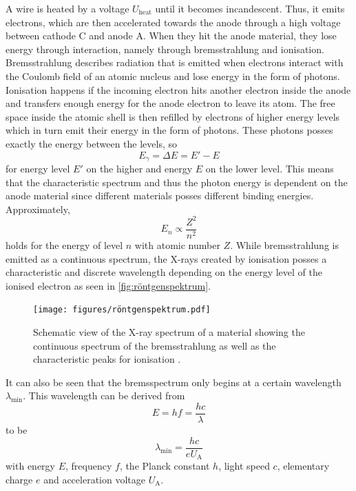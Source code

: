 A wire is heated by a voltage $U_\text{heat}$ until it becomes incandescent.
Thus, it emits electrons, which are then accelerated towards the anode through a high voltage between cathode C and anode A.
When they hit the anode material, they lose energy through interaction, namely through bremsstrahlung and ionisation.
Bremsstrahlung describes radiation that is emitted when electrons interact with the Coulomb field of an atomic nucleus and lose energy in the form of photons.
Ionisation happens if the incoming electron hits another electron inside the anode and transfers enough energy for the anode electron to leave its atom.
The free space inside the atomic shell is then refilled by electrons of higher energy levels which in turn emit their energy in the form of photons.
These photons posses exactly the energy between the levels, so
\begin{equation*}
    E_\gamma = \Delta E = E' - E
\end{equation*}
for energy level $E'$ on the higher and energy $E$ on the lower level.
This means that the characteristic spectrum and thus the photon energy is dependent on the anode material since different materials posses different binding energies.
Approximately,
\begin{equation*}
    E_n \propto \frac{Z^2}{n^2}
\end{equation*}
holds for the energy of level $n$ with atomic number $Z$.
While bremsstrahlung is emitted as a continuous spectrum, the X-rays created by ionisation posses a characteristic and discrete wavelength depending
on the energy level of the ionised electron as seen in \autoref{fig:röntgenspektrum}.

\begin{figure}[H]
    \centering
    \texttt{[image: figures/röntgenspektrum.pdf]}
    \caption{Schematic view of the X-ray spectrum of a material showing the continuous spectrum of the bremsstrahlung as well as the characteristic peaks for ionisation \cite{röntgenspektrum}.}
    \label{fig:röntgenspektrum}
\end{figure}

It can also be seen that the bremsspectrum only begins at a certain wavelength $\lambda_\text{min}$.
This wavelength can be derived from
\begin{equation*}
    E = h f = \frac{h c}{\lambda}
\end{equation*}
to be
\begin{equation*}
    \lambda_\text{min} = \frac{h c}{e U_\text{A}}
\end{equation*}
with energy $E$, frequency $f$, the Planck constant $h$, light speed $c$, elementary charge $e$ and acceleration voltage $U_\text{A}$. \\


